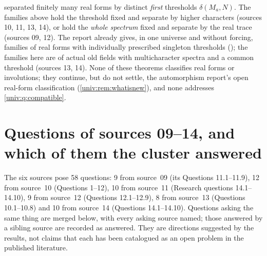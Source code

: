 \documentclass[11pt,letterpaper]{article}
\numberwithin{equation}{section}
\theoremstyle{definition}
\theoremstyle{remark}
\begin{document}
 separated finitely many real forms by distinct
\emph{first} thresholds $\delta(M_a,N)$. The families above hold the threshold fixed and separate by
higher characters (sources 10, 11, 13, 14), or hold the \emph{whole spectrum} fixed and separate by
the real trace (sources 09, 12). The report
 already gives, in one universe and without forcing,
families of real forms with individually prescribed singleton thresholds
(); the families here are of actual old fields with multicharacter
spectra and a common threshold (sources 13, 14). None of these theorems classifies real forms or
involutions; they continue, but do not settle, the automorphism report's open real-form
classification (\cref{univ:rem:whatisnew}), and none addresses \cref{univ:q:compatible}.

\section{Questions of sources 09--14, and which of them the cluster answered}\label{univ:gs:sec:questions}

The six sources pose 58 questions: 9 from source~09 (its Questions 11.1--11.9), 12 from
source~10 (Questions 1--12), 10 from source~11 (Research questions 14.1--14.10), 9 from
source~12 (Questions 12.1--12.9), 8 from source~13 (Questions 10.1--10.8) and 10 from source~14
(Questions 14.1--14.10). Questions asking the same thing are merged below, with every asking
source named; those answered by a sibling source are recorded as answered. They are directions
suggested by the results, not claims that each has been catalogued as an open problem in the
published literature.
\end{document}
